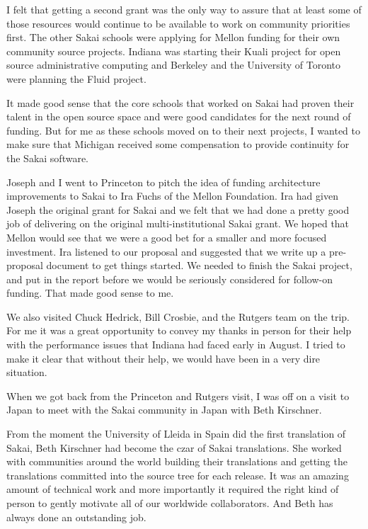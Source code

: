 \documentclass[12pt]{book}
\begin{document}
I felt that getting a second grant was the only way to assure
that at least some of those resources would continue
to be available to work on community priorities first.
The other Sakai schools were applying for Mellon
funding for their own community source projects.
Indiana was starting their Kuali project for
open source administrative computing and Berkeley
and the University of Toronto were planning
the Fluid project.

It made good sense that the core schools that worked
on Sakai had proven their talent in the open source
space and were good candidates for the next round of
funding.   But for me as these schools moved on to
their next projects, I wanted to make sure that
Michigan received some compensation to provide
continuity for the Sakai software.

Joseph and I went to Princeton to pitch the
idea of funding architecture improvements to Sakai to Ira
Fuchs of the Mellon Foundation.   Ira had given Joseph
the original grant for Sakai and we felt that we had
done a pretty good job of delivering on the original
multi-institutional Sakai grant.   We hoped that Mellon
would see that we were a good bet for a smaller and
more focused  investment.   Ira listened to our proposal
and suggested that we write up a pre-proposal document to
get things started.  We needed to finish the Sakai project,
and put in the report before we would be seriously considered
for follow-on funding.  That made good sense to me.

We also visited Chuck Hedrick, Bill Crosbie, and
the Rutgers team on the trip.  For me it was a great
opportunity to convey my thanks in person for their help
with the performance issues that Indiana had faced
early in August.  I tried to make it clear that
without their help, we would have been in a very
dire situation.


When we got back from the Princeton and Rutgers visit,
I was off on a visit to Japan to meet with the
Sakai community in Japan with Beth Kirschner.

From the moment the University of Lleida in Spain
did the first translation of Sakai, Beth Kirschner had
become the czar of Sakai translations.  She worked with
communities around the world building their translations
and getting the translations committed into the
source tree for each release.  It was an amazing amount
of technical work and more importantly it required
the right kind of person to gently motivate all
of our worldwide collaborators.  And Beth has always
done an outstanding job.
\end{document}
